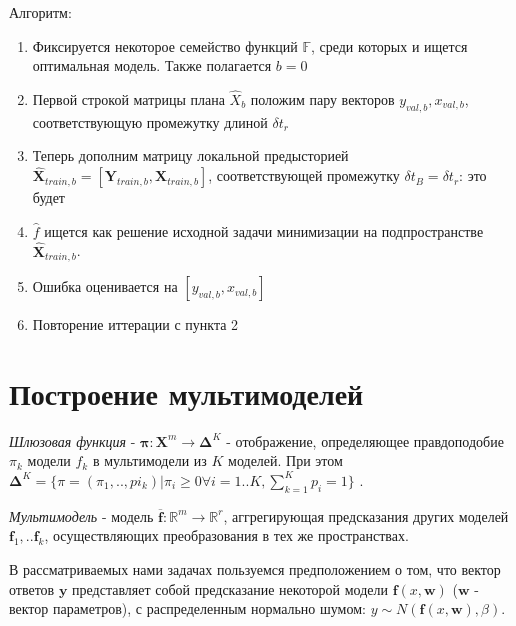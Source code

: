 \documentclass[12pt,twoside]{article}
\begin{document}
	Алгоритм:
\begin{enumerate}
  \item Фиксируется некоторое семейство функций $\mathbb{F}$, среди которых и ищется оптимальная модель. Также полагается $b = 0$
  \item Первой строкой матрицы плана $\hat{X}_b$ положим пару векторов $y_{val, b}, x_{val, b}$, соответствующую промежутку длиной $\delta t_r$
  \item Теперь дополним матрицу локальной предысторией $\hat{\mathbf{X}}_{train, b} =  [ \mathbf{Y}_{train, b},  \mathbf{X}_{train, b}]$, соответствующей промежутку $\delta t_B = \delta t_r$: это будет 

   \item $\hat{f}$ ищется как решение исходной задачи минимизации на подпространстве $\hat{\mathbf{X}}_{train, b}$.

 \item Ошибка оценивается на $[y_{val, b}, x_{val, b}]$

\item Повторение иттерации с пункта 2
\end{enumerate}


\section{Построение мультимоделей}

\begin{Def}
     \emph{Шлюзовая функция} - $\boldsymbol{\pi}: \mathbf{X}^m \rightarrow \boldsymbol{\Delta}^K$  - отображение, определяющее правдоподобие $\pi_k$ модели $f_k$ в мультимодели из $K$ моделей. При этом $\boldsymbol{\Delta}^K =
 \{\pi = (\pi_1, .. , pi_k)  | \pi_i \geq 0 \forall i = 1 .. K, \sum\limits_{k = 1}^K p_i = 1 \}$ .

\end{Def}

\begin{Def}
     \emph{Мультимодель} - модель $\mathbf{\overline{f}}: \mathbb{R}^m \rightarrow \mathbb{R}^r$, аггрегирующая предсказания других моделей $\mathbf{f}_1, .. \mathbf{f}_k$, осуществляющих преобразования в тех же пространствах.
\end{Def}

В рассматриваемых нами задачах пользуемся предположением о  том, что вектор ответов $\mathbf{y}$ представляет собой предсказание некоторой модели $\mathbf{f}(x, \mathbf{w})$ ($\mathbf{w}$ - вектор параметров), с распределенным нормально шумом: $y \sim N(\mathbf{f}(x, \mathbf{w}), \beta)$.
\end{document}
